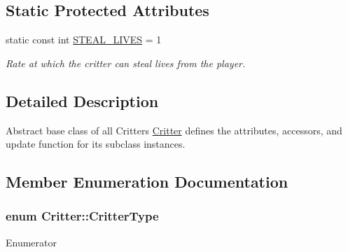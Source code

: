 \subsection*{Static Protected Attributes}
\begin{DoxyCompactItemize}
\item 
static const int \hyperlink{class_critter_a1324eb838f1790e904a0b82c9ceed173}{S\+T\+E\+A\+L\+\_\+\+L\+I\+V\+E\+S} = 1
\begin{DoxyCompactList}\small\item\em Rate at which the critter can steal lives from the player. \end{DoxyCompactList}\end{DoxyCompactItemize}


\subsection{Detailed Description}
Abstract base class of all Critters \hyperlink{class_critter}{Critter} defines the attributes, accessors, and update function for its subclass instances. 

\subsection{Member Enumeration Documentation}
\hypertarget{class_critter_acda8a5c3234b66101e0546d75d6f90f1}{
\subsubsection[{Critter\+Type}]{\setlength{\rightskip}{0pt plus 5cm}enum {\bf Critter\+::\+Critter\+Type}}}\label{class_critter_acda8a5c3234b66101e0546d75d6f90f1}
\begin{Desc}
\item[Enumerator]\par
\begin{description}
\item[{\em 
\hypertarget{class_critter_acda8a5c3234b66101e0546d75d6f90f1a91135fa8da5b64a8a556e8c198b46fe9}{B\+L\+A\+C\+K\+\_\+\+C\+A\+T}\label{class_critter_acda8a5c3234b66101e0546d75d6f90f1a91135fa8da5b64a8a556e8c198b46fe9}
}]\item[{\em 
\hypertarget{class_critter_acda8a5c3234b66101e0546d75d6f90f1ac88c727edcec187617ee3707d2c193c5}{W\+H\+I\+T\+E\+\_\+\+C\+A\+T}\label{class_critter_acda8a5c3234b66101e0546d75d6f90f1ac88c727edcec187617ee3707d2c193c5}
}]\end{description}
\end{Desc}


